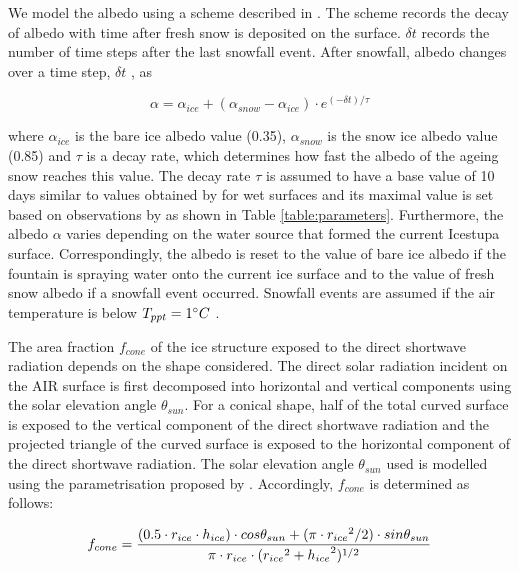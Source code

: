 \documentclass[utf8]{frontiersSCNS} %
\begin{document}
We model the albedo using a scheme described in \cite{OerlemansKnap_1998}. The scheme records the decay of albedo with
time after fresh snow is deposited on the surface. $\delta t$ records the number of time steps after the last snowfall
event. After snowfall, albedo changes over a time step, $\delta t$ , as

\begin{equation} \alpha=\alpha_{ice}+(\alpha_{snow}-\alpha_{ice}) \cdot e^{(-\delta t)/\tau} \label{eqn:a}
\end{equation}

where $\alpha_{ice}$ is the bare ice albedo value (0.35), $\alpha_{snow}$ is the snow ice albedo value (0.85) and
$\tau$ is a decay rate, which determines how fast the albedo of the ageing snow reaches this value.  The decay rate
$\tau$ is assumed to have a base value of 10 days similar to values obtained by \cite{Schmidt_2017} for wet surfaces
and its maximal value is set based on observations by \cite{OerlemansKnap_1998} as shown in Table
\ref{table:parameters}.  Furthermore, the albedo $\alpha$ varies depending on the water source that formed the current
Icestupa surface.  Correspondingly, the albedo is reset to the value of bare ice albedo if the fountain is spraying
water onto the current ice surface and to the value of fresh snow albedo if a snowfall event occurred. Snowfall events
are assumed if the air temperature is below $T_{ppt}=1 \degree C$ \citep{FujitaAgeta_2000}.

The area fraction $f_{cone}$ of the ice structure exposed to the direct shortwave radiation depends on the shape
considered. The direct solar radiation incident on the AIR surface is first decomposed into horizontal and vertical
components using the solar elevation angle $\theta_{sun}$. For a conical shape, half of the total curved surface is
exposed to the vertical component of the direct shortwave radiation and the projected triangle of the curved surface is
exposed to the horizontal component of the direct shortwave radiation. The solar elevation angle $\theta_{sun}$ used is
modelled using the parametrisation proposed by \cite{Woolf_1968}. Accordingly, $f_{cone}$ is determined as follows:

\begin{equation} \begin{split} f_{cone}& =\frac{(0.5 \cdot r_{ice} \cdot h_{ice}) \cdot cos \theta_{sun} +(\pi \cdot
{r_{ice}}^2/2) \cdot sin \theta_{sun} }{\pi \cdot r_{ice} \cdot ({r_{ice}}^2+{h_{ice}}^2)^{1/2}}\\ \end{split}
\label{eqn:f_{cone}} \end{equation}
\end{document}
